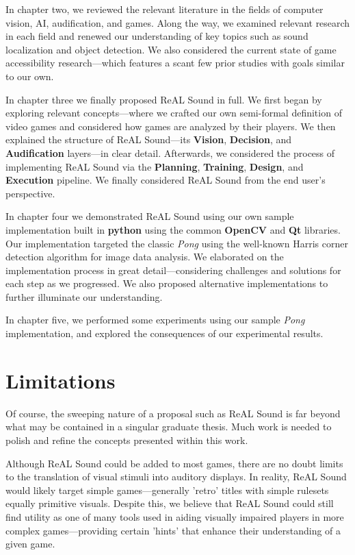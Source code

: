 \documentclass{report}
\newcommand{\rs}{ReAL Sound\xspace}
\newcommand{\plan}{\textbf{Planning}\xspace}
\newcommand{\train}{\textbf{Training}\xspace}
\newcommand{\design}{\textbf{Design}\xspace}
\newcommand{\exec}{\textbf{Execution}\xspace}
\newcommand{\vision}{\textbf{Vision}\xspace}
\newcommand{\decision}{\textbf{Decision}\xspace}
\newcommand{\audio}{\textbf{Audification}\xspace}
\newcommand{\tech}[1]{\textbf{#1}}
\begin{document}
In chapter two, we reviewed the relevant literature in the fields of computer vision, AI, audification, and games. Along the way, we examined relevant research in each field and renewed our understanding of key topics such as sound localization and object detection. We also considered the current state of game accessibility research---which features a scant few prior studies with goals similar to our own.

In chapter three we finally proposed \rs in full. We first began by exploring relevant concepts---where we crafted our own semi-formal definition of video games and considered how games are analyzed by their players. We then explained the structure of \rs---its \vision, \decision, and \audio layers---in clear detail. Afterwards, we considered the process of implementing \rs via the \plan, \train, \design, and \exec pipeline. We finally considered \rs from the end user's perspective.

In chapter four we demonstrated \rs using our own sample implementation built in \tech{python} using the common \tech{OpenCV} and \tech{Qt} libraries. Our implementation targeted the classic \emph{Pong} using the well-known Harris corner detection algorithm for image data analysis. We elaborated on the implementation process in great detail---considering challenges and solutions for each step as we progressed. We also proposed alternative implementations to further illuminate our understanding.

In chapter five, we performed some experiments using our sample \emph{Pong} implementation, and explored the consequences of our experimental results.

\section{Limitations}
Of course, the sweeping nature of a proposal such as \rs is far beyond what may be contained in a singular graduate thesis. Much work is needed to polish and refine the concepts presented within this work.

Although \rs could be added to most games, there are no doubt limits to the translation of visual stimuli into auditory displays. In reality, \rs would likely target simple games---generally 'retro' titles with simple rulesets equally primitive visuals. Despite this, we believe that \rs could still find utility as one of many tools used in aiding visually impaired players in more complex games---providing certain 'hints' that enhance their understanding of a given game. 
\end{document}
